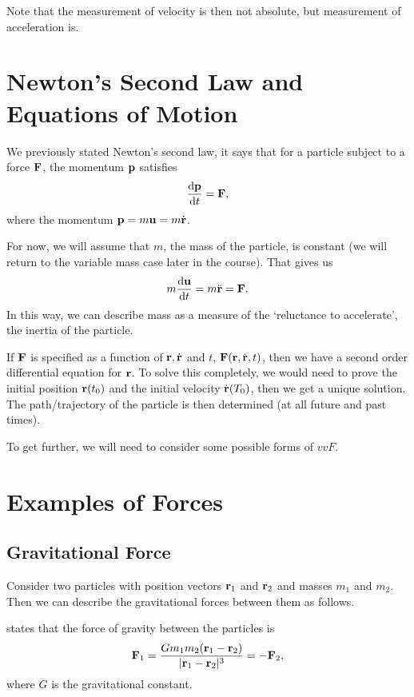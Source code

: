 \documentclass[a4paper]{scrreprt}
\begin{document}
Note that the measurement of velocity is then not absolute, but measurement of acceleration is.

\section{Newton's Second Law and Equations of Motion}

We previously stated Newton's second law, it says that for a particle subject to a force $\mathbf{F}$, the momentum $\mathbf{p}$ satisfies
$$
\frac{
	\mathrm{d} \mathbf{p}
}{\mathrm{d} t} = \mathbf{F},
$$
where the momentum $\mathbf{p} = m \mathbf{u} = m \dot{\mathbf{r}}$. 

For now, we will assume that $m$, the mass of the particle, is constant (we will return to the variable mass case later in the course). That gives us
$$
m \frac{\mathrm{d} \mathbf{u}}{\mathrm{d} t} = m \ddot{\mathbf{r}} = \mathbf{F}.
$$
In this way, we can describe mass as a measure of the `reluctance to accelerate', the inertia of the particle.

If $\mathbf{F}$ is specified as a function of $\mathbf{r}, \dot{\mathbf{r}}$ and $t$, $\mathbf{F}(\mathbf{r}, \dot{\mathbf{r}}, t)$, then we have a second order differential equation for $\mathbf{r}$. To solve this completely, we would need to prove the initial position $\mathbf{r}(t_0)$ and the initial velocity $\dot{\mathbf{r}}(T_0)$, then we get a unique solution. The path/trajectory of the particle is then determined (at all future and past times).

To get further, we will need to consider some possible forms of $vv{F}$.

\section{Examples of Forces}

\subsection{Gravitational Force}

Consider two particles with position vectors $\mathbf{r}_1$ and $\mathbf{r}_2$ and masses $m_1$ and $m_2$. Then we can describe the gravitational forces between them as follows.


\begin{law*}
	 states that the force of gravity between the particles is
	$$
	\mathbf{F}_1 = \frac{G m_1 m_2 (\mathbf{r}_1 - \mathbf{r}_2)}{|\mathbf{r}_1 - \mathbf{r}_2|^3} = -\mathbf{F}_2,
	$$
	where $G$ is the gravitational constant.
\end{law*}
\end{document}
